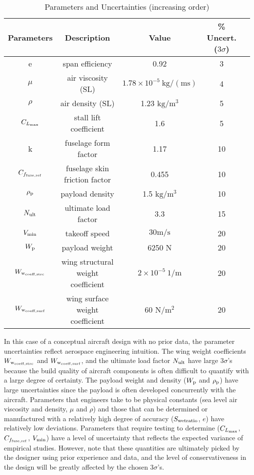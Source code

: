 \begin{table}
\begin{center}
\caption{\label{tab:uncertainties} Parameters and Uncertainties (increasing order)}
\begin{tabular}{c c c c c}
\hline
Parameters & Description & Value & \% Uncert. ($3\sigma$) \\
\hline
e & span efficiency & 0.92 & 3\\
$\mu$ & air viscosity (SL) & $1.78 \times 10^{-5}~\mathrm{kg/(ms)}$ & 4 \\
$\rho$ & air density (SL) & 1.23 $\mathrm{kg/m^3}$ & 5 \\
$C_{L_{\rm{max}}}$ & stall lift coefficient & 1.6 & 5\\
k & fuselage form factor & 1.17 & 10\\
$C_{f_{\rm{fuse, ref}}}$ & fuselage skin friction factor & 0.455 & 10 \\
$\rho_{\rm{p}}$ & payload density & 1.5 $\mathrm{kg/m^3}$ & 10 \\
$N_{\rm{ult}}$ & ultimate load factor & 3.3 & 15\\
$V_{\rm{min}}$ & takeoff speed & $30 \mathrm{m/s}$ & 20\\
$W_{\rm{p}}$ & payload weight & 6250 N & 20\\
$W_{\rm{w}_{\rm{coeff,strc}}}$ & wing structural weight coefficient & $2 \times 10^{-5}~1/\mathrm{m}$ & 20\\
$W_{\rm{w}_{\rm{coeff,surf}}}$ & wing surface weight coefficient & 60 $\mathrm{N/m^2}$ & 20\\
\hline
\end{tabular}
\end{center}
\end{table}

In this case of a conceptual aircraft design with no prior data,
the parameter uncertainties reflect aerospace engineering intuition.
The wing weight coefficients $W_{\rm{w}_{\rm{coeff,strc}}}$ and $W_{\rm{w}_{\rm{coeff,surf}}}$,
and the ultimate load factor $N_{\rm{ult}}$ have
large $3\sigma$'s because the build quality of aircraft components is
often difficult to quantify with a large degree of certainty.
The payload weight and density ($W_{\rm{p}}$ and $\rho_{\rm{p}}$) have large uncertainties
since the payload is often developed concurrently with the aircraft.
Parameters that engineers take to be
physical constants (sea level air viscosity and density, $\mu$ and $\rho$) and those that can be determined or manufactured with a relatively
high degree of accuracy ($S_{\rm{wetratio}}$, $e$) have relatively low deviations.
Parameters that require testing to determine ($C_{L_{\rm{max}}}$, $C_{f_{\rm{fuse, ref}}}$,
$V_{\rm{min}}$) have a level of uncertainty
that reflects the expected variance of empirical studies. However, note that
these quantities are ultimately picked by the designer using prior experience and data,
and the level of conservativeness in the
design will be greatly affected by the chosen $3\sigma$'s.

